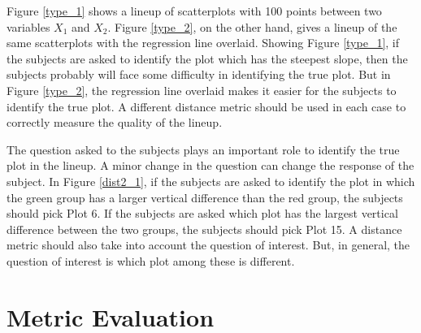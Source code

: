 \documentclass[12]{article}
\begin{document}
Figure \ref{type_1} shows a lineup of scatterplots with 100 points between two variables $X_1$ and $X_2$. Figure \ref{type_2}, on the other hand, gives a lineup of the same scatterplots with the regression line overlaid. Showing Figure \ref{type_1}, if the subjects are asked to identify the plot which has the steepest slope, then the subjects probably will face some difficulty in identifying the true plot. But in Figure \ref{type_2}, the regression line overlaid makes it easier for the subjects to identify the true plot. A different distance metric should be used in each case to correctly measure the quality of the lineup.

The question asked to the subjects plays an important role to identify the true plot in the lineup. A minor change in the question can change the response of the subject. In Figure \ref{dist2_1}, if the subjects are asked to identify the plot in which the green group has a larger vertical difference than the red group, the subjects should pick Plot 6. If the subjects are asked which plot has the largest vertical difference between the two groups, the subjects should pick Plot 15. A distance metric should also take into account the question of interest. But, in general, the question of interest is which plot among these is different.

\section{Metric Evaluation} \label{sec:eval}
\end{document}
